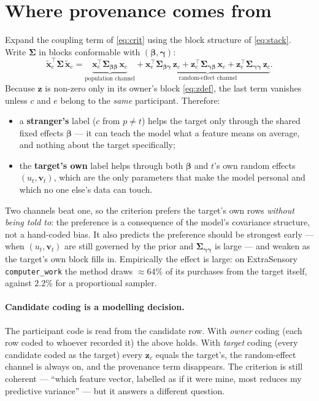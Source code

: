 \documentclass[11pt]{article}
\newcommand{\bb}{\bm{\beta}}
\newcommand{\bu}{\bm{\gamma}}
\newcommand{\bx}{\bm{x}}
\newcommand{\bz}{\bm{z}}
\newcommand{\bS}{\bm{\Sigma}}
\begin{document}
\section{Where provenance comes from}
\label{sec:prov}

Expand the coupling term of \eqref{eq:crit} using the block structure of \eqref{eq:stack}. Write
$\bS$ in blocks conformable with $(\bb,\bu)$:
\begin{equation}
  \tilde{\bx}_e^{\!\top}\bS\,\tilde{\bx}_c
  = \underbrace{\bx_e^{\!\top}\bS_{\bb\bb}\,\bx_c}_{\text{population channel}}
  + \underbrace{\bx_e^{\!\top}\bS_{\bb\bu}\,\bz_c
    + \bz_e^{\!\top}\bS_{\bu\bb}\,\bx_c
    + \bz_e^{\!\top}\bS_{\bu\bu}\,\bz_c}_{\text{random-effect channel}} .
  \label{eq:blocks}
\end{equation}
Because $\bz$ is non-zero only in its owner's block \eqref{eq:zdef}, the last term vanishes
unless $c$ and $e$ belong to the \emph{same} participant. Therefore:
\begin{itemize}
  \item a \textbf{stranger's} label ($c$ from $p \neq t$) helps the target only through the
        shared fixed effects $\bb$ --- it can teach the model what a feature means on average,
        and nothing about the target specifically;
  \item the \textbf{target's own} label helps through both $\bb$ and $t$'s own random effects
        $(u_t,\bm{v}_t)$, which are the only parameters that make the model personal and which
        no one else's data can touch.
\end{itemize}
Two channels beat one, so the criterion prefers the target's own rows \emph{without being told
to}: the preference is a consequence of the model's covariance structure, not a hand-coded bias.
It also predicts the preference should be strongest early --- when $(u_t,\bm{v}_t)$ are still
governed by the prior and $\bS_{\bu\bu}$ is large --- and weaken as the target's own block fills
in. Empirically the effect is large: on ExtraSensory \texttt{computer\_work} the method draws
$\approx 64\%$ of its purchases from the target itself, against $2.2\%$ for a proportional
sampler.

\paragraph{Candidate coding is a modelling decision.} The participant code is read from the
candidate row. With \emph{owner} coding (each row coded to whoever recorded it) the above holds.
With \emph{target} coding (every candidate coded as the target) every $\bz_c$ equals the
target's, the random-effect channel is always on, and the provenance term disappears. The
criterion is still coherent --- ``which feature vector, labelled as if it were mine, most reduces
my predictive variance'' --- but it answers a different question.
\end{document}
